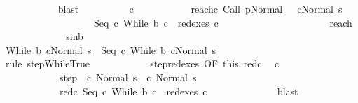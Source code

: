 \begin{isabellebody}
\ \ \ \ \ \ \ \ \ \ \isamarkupfalse%
\ blast\isanewline
\ \ \ \ \ \ \ \ \isamarkupfalse%
\ c{\isacharprime}{\isacharprime}\ \isanewline
\ \ \ \ \ \ \ \ \ \ reach{\isacharunderscore}c{\isacharcolon}\ {\isachardoublequoteopen}{\isasymGamma}{\isasymturnstile}{\isacharparenleft}Call\ p{\isacharcomma}Normal\ {\isasymsigma}{\isacharparenright}\ {\isasymrightarrow}\isactrlsup {\isacharplus}\ {\isacharparenleft}c{\isacharprime}{\isacharprime}{\isacharcomma}Normal\ s{\isacharparenright}{\isachardoublequoteclose}\ \isanewline
\ \ \ \ \ \ \ \ \ \ \ \ \ \ \ \ \ \ \ {\isachardoublequoteopen}Seq\ c\ {\isacharparenleft}While\ b\ c{\isacharparenright}\ {\isasymin}\ redexes\ c{\isacharprime}{\isacharprime}{\isachardoublequoteclose}\isanewline
\ \ \ \ \ \ \ \ \isamarkupfalse%
\ {\isacharminus}\isanewline
\ \ \ \ \ \ \ \ \ \ \isamarkupfalse%
\ reach\isanewline
\ \ \ \ \ \ \ \ \ \ \isamarkupfalse%
\ \isamarkupfalse%
\ s{\isacharunderscore}in{\isacharunderscore}b\ \ \isanewline
\ \ \ \ \ \ \ \ \ \ \isamarkupfalse%
\ {\isachardoublequoteopen}{\isasymGamma}{\isasymturnstile}{\isacharparenleft}While\ b\ c{\isacharcomma}Normal\ s{\isacharparenright}\ {\isasymrightarrow}\ {\isacharparenleft}Seq\ c\ {\isacharparenleft}While\ b\ c{\isacharparenright}{\isacharcomma}Normal\ s{\isacharparenright}{\isachardoublequoteclose}\isanewline
\ \ \ \ \ \ \ \ \ \ \ \ \isamarkupfalse%
\ {\isacharparenleft}rule\ step{\isachardot}WhileTrue{\isacharparenright}\isanewline
\ \ \ \ \ \ \ \ \ \ \isamarkupfalse%
\ step{\isacharunderscore}redexes\ {\isacharbrackleft}OF\ this\ red{\isacharunderscore}c{\isacharprime}{\isacharbrackright}\ \isamarkupfalse%
\ c{\isacharprime}{\isacharprime}\ \isanewline
\ \ \ \ \ \ \ \ \ \ \ \ step{\isacharcolon}\ {\isachardoublequoteopen}{\isasymGamma}{\isasymturnstile}\ {\isacharparenleft}c{\isacharprime}{\isacharcomma}\ Normal\ s{\isacharparenright}\ {\isasymrightarrow}\ {\isacharparenleft}c{\isacharprime}{\isacharprime}{\isacharcomma}\ Normal\ s{\isacharparenright}{\isachardoublequoteclose}\ \isanewline
\ \ \ \ \ \ \ \ \ \ \ \ red{\isacharunderscore}c{\isacharprime}{\isacharprime}{\isacharcolon}\ {\isachardoublequoteopen}Seq\ c\ {\isacharparenleft}While\ b\ c{\isacharparenright}\ {\isasymin}\ redexes\ c{\isacharprime}{\isacharprime}{\isachardoublequoteclose}\isanewline
\ \ \ \ \ \ \ \ \ \ \ \ \isamarkupfalse%
\ blast\isanewline
\ \ \ \ \ \ \ \ \ \ \isamarkupfalse%

\end{isabellebody}
